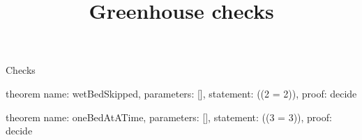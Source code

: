\begin{lexlean}{Checks}
\title{Greenhouse checks}
\begin{semanticmodule}
theorem{
  name: wetBedSkipped,
  parameters: [],
  statement: ((2 = 2)),
  proof: decide{}
}

theorem{
  name: oneBedAtATime,
  parameters: [],
  statement: ((3 = 3)),
  proof: decide{}
}
\end{semanticmodule}
\end{lexlean}
